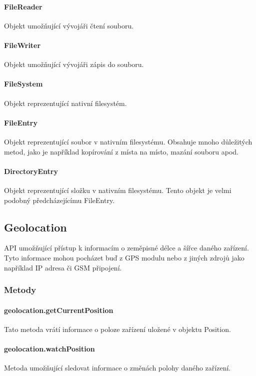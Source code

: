 \paragraph{FileReader}
Objekt umožňující vývojáři čtení souboru.

\paragraph{FileWriter}
Objekt umožňující vývojáři zápis do souboru.

\paragraph{FileSystem}
Objekt reprezentující nativní filesystém.

\paragraph{FileEntry}
Objekt reprezentující soubor v nativním filesystému. Obsahuje mnoho důležitých metod, jako je například kopírování z místa na místo, mazání souboru apod.

\paragraph{DirectoryEntry}
Objekt reprezentující složku v nativním filesystému. Tento objekt je velmi podobný předcházejícímu FileEntry.

\subsection{Geolocation}
API umožňující přístup k informacím o zeměpisné délce a šířce daného zařízení. Tyto informace mohou pocházet buď z GPS modulu nebo z jiných zdrojů jako například IP adresa či GSM připojení.

\subsubsection{Metody}
\paragraph{geolocation.getCurrentPosition}
Tato metoda vrátí informace o poloze zařízení uložené v objektu Position.

\paragraph{geolocation.watchPosition}
Metoda umožňující sledovat informace o změnách polohy daného zařízení.

